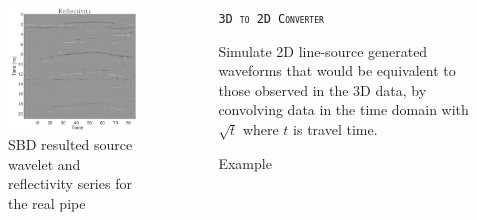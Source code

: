 \documentclass[final]{beamer}
\newlength{\sepwid}
\newlength{\onecolwid}
\newlength{\twocolwid}
\begin{document}
\begin{frame}[t]
\begin{columns}[t]
\begin{column}{\twocolwid}
\begin{columns}[t,totalwidth=\twocolwid]
\begin{column}{\onecolwid}
\begin{block}{}
\begin{figure}
	\includegraphics[width=0.65\linewidth]{SBD_pipe_refl.png}
	\caption{\textrm{SBD resulted source wavelet and reflectivity series for the real pipe~\cite{jazayeri2017sparse}}}
\end{figure}
\end{block}



\end{column} %

\end{columns} %

\end{column} %

\begin{column}{\sepwid}\end{column} %

\begin{column}{\onecolwid} %

\begin{block}{\textsc{\texttt{3D to 2D Converter}}}
	
	Simulate 2D line-source generated waveforms that would be equivalent to those observed in the 3D data, by convolving data in the time domain with $\sqrt{t}$ where $t$ is travel time.
	
\end{block}

\vspace{3cm}

\begin{block}{Example}
	

\end{block}
\end{column}
\end{columns}
\end{frame}
\end{document}
